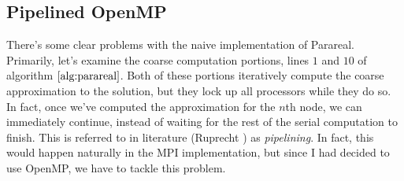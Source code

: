 \subsection{Pipelined OpenMP}

There's some clear problems with the naive implementation of Parareal.
Primarily, let's examine the coarse computation portions, lines $1$ and $10$ of
algorithm $\ref{alg:parareal}$. Both of these portions iteratively compute the
coarse approximation to the solution, but they lock up all processors while they
do so. In fact, once we've computed the approximation for the $n$th node, we can
immediately continue, instead of waiting for the rest of the serial computation
to finish. This is referred to in literature (Ruprecht \cite{ruprecht}) as
\textit{pipelining}. In fact, this would happen naturally in the MPI
implementation, but since I had decided to use OpenMP, we have to tackle this
problem.


